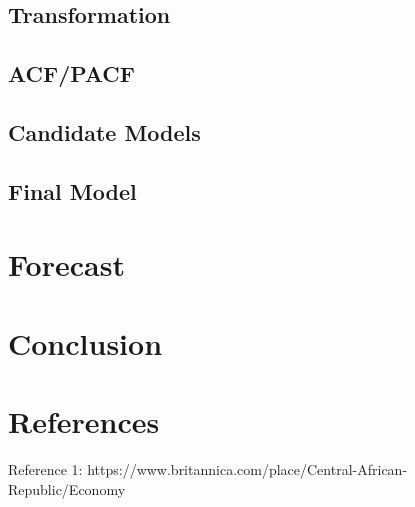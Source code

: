 \documentclass[11pt]{article}
\begin{document}
\subsection{Transformation}
\subsection{ACF/PACF}
\subsection{Candidate Models}
\subsection{Final Model}

\section{Forecast}

\section{Conclusion}

\newpage

\section{References}

Reference 1: https://www.britannica.com/place/Central-African-Republic/Economy
\end{document}
